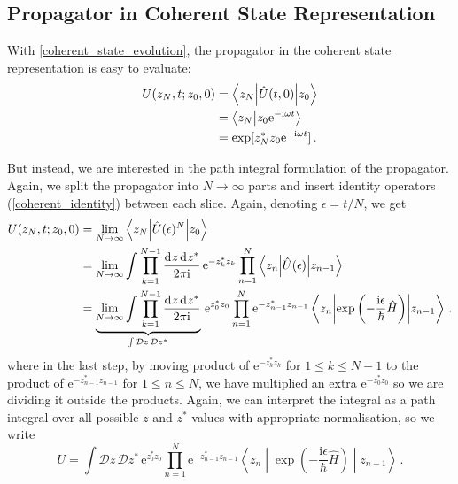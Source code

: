 \documentclass{article}
\theoremstyle{plain}\theoremheaderfont{\normalfont\itshape}\theorembodyfont{\rmfamily}\theoremseparator{.}\newtheorem*{rem}{Remark}\newtheorem*{ex}{Example}\newtheorem*{proof}{Proof}\newtheorem*{altp}{Alternative proof}
\theoremstyle{plain}\theoremheaderfont{\normalfont\bfseries}\theorembodyfont{\rmfamily}\theoremseparator{.}\newtheorem{thm}{Theorem}[section]\newtheorem{lem}[thm]{Lemma}\newtheorem{prop}[thm]{Proposition}\newtheorem*{cor}{Corollary}\newtheorem{defn}[thm]{Definition}\newtheorem{clm}[thm]{Claim}\newtheorem{clminproof}{Claim}
\theoremstyle{break}\theoremheaderfont{\normalfont\itshape}\theorembodyfont{\rmfamily}\theoremseparator{.\medskip}\newtheorem*{proofskip}{Proof}\newtheorem*{exs}{Examples}\newtheorem*{rems}{Remarks}
\theoremstyle{break}\theoremheaderfont{\normalfont\bfseries}\theorembodyfont{\rmfamily}\theoremseparator{.\medskip}\newtheorem{lemskip}[thm]{Lemma}\newtheorem{defnskip}[thm]{Definition}\newtheorem{propskip}[thm]{Proposition}\newtheorem{thmskip}[thm]{Theorem}
\numberwithin{equation}{section}
\newcommand{\ii}{\mathrm{i}}
\newcommand{\ee}{\mathrm{e}}
\newcommand{\dd}[2][]{\mathrm{d}^{#1} #2\,}
\newcommand{\DD}[1]{\mathcal{D} #1\,}
\renewcommand{\d}[2][]{\mathrm{d}^{#1} #2}
\newcommand{\D}[1]{\mathcal{D} #1}
\newcommand{\braket}[2]{\left\langle #1 \middle| #2 \right\rangle}
\newcommand{\mel}[3]{\left\langle #1 \middle| #2 \middle| #3 \right\rangle}
\begin{document}
    \subsection{Propagator in Coherent State Representation}
    With \cref{coherent_state_evolution}, the propagator in the coherent state representation is easy to evaluate:
    \begin{align}
        U(z_N,t;z_0,0)&=\mel{z_N}{\hat{U}(t,0)}{z_0}\notag\\
        &=\braket{z_N}{z_0\ee^{-\ii\omega t}}\notag\\
        &=\exp[z_N^* z_0 \ee^{-\ii\omega t}]\,.
    \end{align}

    But instead, we are interested in the path integral formulation of the propagator. Again, we split the propagator into \(N\to\infty\) parts and insert identity operators (\ref{coherent_identity}) between each slice. Again, denoting \(\epsilon=t/N\), we get
    \begin{align}
        U(z_N,t;z_0,0)&=\lim_{N\to\infty}\mel{z_N}{\hat{U}(\epsilon)^N}{z_0}\notag \\
        &=\lim_{N\to\infty}\int\prod_{k=1}^{N-1} \frac{\dd{z}\d{z^*}}{2\pi\ii}\, \ee^{-z_k^* z_k} \prod_{n=1}^{N}\mel{z_n}{\hat{U}(\epsilon)}{z_{n-1}}\notag\\
        &=\underbrace{\lim_{N\to\infty}\int\prod_{k=1}^{N-1} \frac{\dd{z}\d{z^*}}{2\pi\ii}}_{\int\DD{z}\D{z^*}}\, \ee^{z_0^* z_0} \prod_{n=1}^{N}\ee^{-z_{n-1}^* z_{n-1}}\mel{z_n}{\exp\left(-\frac{\ii\epsilon}{\hbar}\hat{H}\right)}{z_{n-1}}\,.
    \end{align}
    where in the last step, by moving product of \(\ee^{-z_k^* z_k}\) for \(1\le k\le N-1\) to the product of \(\ee^{-z_{n-1}^* z_{n-1}}\) for \(1\le n\le N\), we have multiplied an extra \(\ee^{-z_0^* z_0}\) so we are dividing it outside the products. Again, we can interpret the integral as a path integral over all possible \(z\) and \(z^*\) values with appropriate normalisation, so we write
    \begin{equation}
        U=\int\DD{z}\DD{z^*}\ee^{z_0^* z_0}\prod_{n=1}^{N}\ee^{-z_{n-1}^* z_{n-1}}\mel{z_n}{\exp\left(-\frac{\ii\epsilon}{\hbar}\hat{H}\right)}{z_{n-1}}\,.
    \end{equation}
\end{document}
